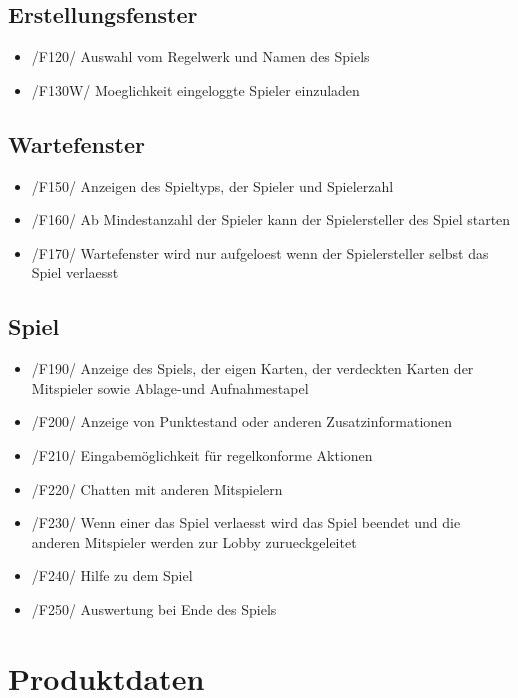 \documentclass{article}
\begin{document}
\subsection{Erstellungsfenster}
\begin{itemize}
	\item /F120/ Auswahl vom \gls{Regelwerk} und  Namen des Spiels 
	\item /F130W/ Moeglichkeit eingeloggte Spieler einzuladen
\end{itemize}

\subsection{Wartefenster}
\begin{itemize}
	\item /F150/ Anzeigen des Spieltyps, der Spieler und Spielerzahl
	\item /F160/ Ab Mindestanzahl der Spieler kann der Spielersteller des Spiel starten
	\item /F170/ Wartefenster wird nur aufgeloest wenn der Spielersteller selbst das Spiel verlaesst
\end{itemize}

\subsection{Spiel}
\begin{itemize}
	\item /F190/ Anzeige des Spiels, der eigen Karten, der verdeckten Karten der Mitspieler sowie Ablage-und Aufnahmestapel
	\item /F200/ Anzeige von Punktestand oder anderen Zusatzinformationen
	\item /F210/ Eingabemöglichkeit für regelkonforme Aktionen
	\item /F220/ Chatten mit anderen Mitspielern
	\item /F230/ Wenn einer das Spiel verlaesst wird das Spiel beendet und die anderen Mitspieler werden zur \gls{Lobby} zurueckgeleitet
	\item /F240/ Hilfe zu dem Spiel
	\item /F250/ Auswertung bei Ende des Spiels
\end{itemize}

\section{Produktdaten}
\end{document}
